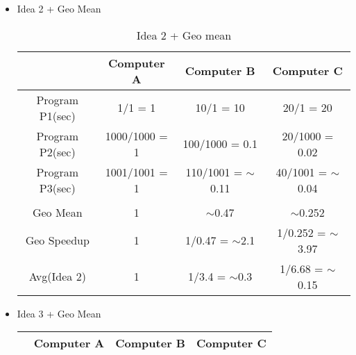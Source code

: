 \documentclass[12pt]{article}
\begin{document}
            \begin{itemize}
                \item {Idea 2 + Geo Mean}
                    \begin{table}[]
                        \centering
                        \begin{tabular}{cccc}
\hline
\multicolumn{1}{|c|}{}                & \multicolumn{1}{c|}{Computer A}    & \multicolumn{1}{c|}{Computer B}            & \multicolumn{1}{c|}{Computer C}           \\ \hline
\multicolumn{1}{|c|}{Program P1(sec)} & \multicolumn{1}{c|}{1/1 = 1}       & \multicolumn{1}{c|}{10/1 = 10}             & \multicolumn{1}{c|}{20/1 = 20}            \\ \hline
\multicolumn{1}{|c|}{Program P2(sec)} & \multicolumn{1}{c|}{1000/1000 = 1} & \multicolumn{1}{c|}{100/1000 = 0.1}        & \multicolumn{1}{c|}{20/1000 = 0.02}       \\ \hline
\multicolumn{1}{|c|}{Program P3(sec)} & \multicolumn{1}{c|}{1001/1001 = 1} & \multicolumn{1}{c|}{110/1001 = $\sim$0.11} & \multicolumn{1}{c|}{40/1001 = $\sim$0.04} \\ \hline
                                      &                                    &                                            &                                           \\ \hline
\multicolumn{1}{|c|}{Geo Mean}        & \multicolumn{1}{c|}{1}             & \multicolumn{1}{c|}{$\sim$0.47}            & \multicolumn{1}{c|}{$\sim$0.252}          \\ \hline
\multicolumn{1}{|c|}{Geo Speedup}     & \multicolumn{1}{c|}{1}             & \multicolumn{1}{c|}{1/0.47 = $\sim$2.1}    & \multicolumn{1}{c|}{1/0.252 = $\sim$3.97} \\ \hline
\multicolumn{1}{|c|}{Avg(Idea 2)}     & \multicolumn{1}{c|}{1}             & \multicolumn{1}{c|}{1/3.4 = $\sim$0.3}     & \multicolumn{1}{c|}{1/6.68 = $\sim$0.15}  \\ \hline
\end{tabular}
                        \caption{Idea 2 + Geo mean}
                        \label{tab:my_label}
                    \end{table}
                \item {Idea 3 + Geo Mean}
                    \begin{table}[]
                        \centering
                        \begin{tabular}{cccc}
\hline
\multicolumn{1}{|c|}{}                & \multicolumn{1}{c|}{Computer A}    & \multicolumn{1}{c|}{Computer B}           & \multicolumn{1}{c|}{Computer C}           \\ \hline

\end{tabular}
\end{table}
\end{itemize}
\end{document}
